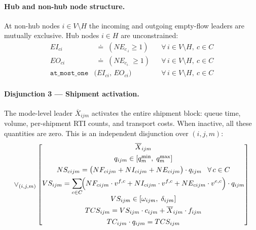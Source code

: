
\paragraph{Hub and non-hub node structure.}
At non-hub nodes $i\in V\setminus H$ the incoming and outgoing
empty-flow leaders are mutually exclusive. Hub nodes $i\in H$
are unconstrained:
%
\begin{align}
  EI_{ci}
    &\;\doteq\; (NE_{c}_{\cdot i} \geq 1)
  && \forall\, i\in V\setminus H,\ c\in C
  \label{eq:hub-EI}\\
  EO_{ci}
    &\;\doteq\; (NE_{c}_{i\cdot} \geq 1)
  && \forall\, i\in V\setminus H,\ c\in C
  \label{eq:hub-EO}\\
  \texttt{at\_most\_one}&\bigl(EI_{ci},\,EO_{ci}\bigr)
  && \forall\, i\in V\setminus H,\ c\in C
  \label{eq:non-hub}
\end{align}


\paragraph{Disjunction 3 — Shipment activation.}
The mode-level leader $\overline{X}_{ijm}$ activates the entire
shipment block: queue time, volume, per-shipment RTI counts, and
transport costs. When inactive, all these quantities are zero.
This is an independent disjunction over $(i,j,m)$:
%
\begin{equation}
  \vee_{(i,j,m)}
  \begin{bmatrix}
    \overline{X}_{ijm} \\[4pt]
    q_{ijm} \in [q^{\min}_{m},\; q^{\max}_{m}] \\[4pt]
    NS_{cijm} =
      \bigl(NF_{cijm}+NI_{cijm}+NE_{cijm}\bigr)
      \cdot q_{ijm}
      \hspace{8pt} \forall\,c\in C \\[4pt]
    VS_{ijm} =
      \displaystyle\sum_{c\in C}\!\Bigl(
        NF_{cijm}\cdot v^{f,c}
       +NI_{cijm}\cdot v^{f,c}
       +NE_{cijm}\cdot v^{e,c}
      \Bigr)\cdot q_{ijm} \\[6pt]
    VS_{ijm} \in [\omega_{ijm},\;\delta_{ijm}] \\[4pt]
    TCS_{ijm} = VS_{ijm}\cdot c_{ijm}
      + \overline{X}_{ijm}\cdot f_{ijm} \\[4pt]
    TC_{ijm}\cdot q_{ijm} = TCS_{ijm}
  \end{bmatrix}
  \label{eq:disj-ship}
\end{equation}

